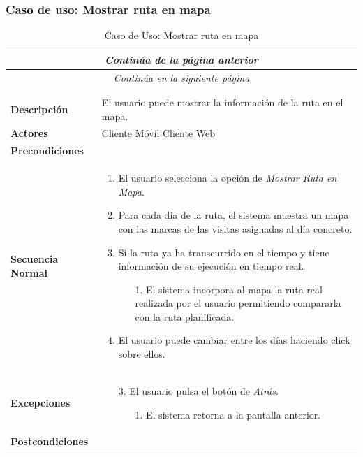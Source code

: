 \subsubsection*{Caso de uso: Mostrar ruta en mapa}
\begin{longtable}{| p{4cm} | p{10cm} |}
\endfirsthead
\multicolumn{2}{c}{\textit{Continúa de la página anterior}}\\[12pt]
\hline
\endhead
\hline
\multicolumn{2}{c}{\textit{Continúa en la siguiente página}} \\
\endfoot
\hline
\caption{Caso de Uso: Mostrar ruta en mapa}\label{fig:1}\\
\endlastfoot


\hline
\multicolumn{2}{|c|}{\textbf{CU$<$09$>$ - Mostrar Ruta en Mapa}} \\

\hline
\textbf{Descripción} &
El usuario puede mostrar la información de la ruta en el mapa.\\

\hline
\textbf{Actores} &
Cliente Móvil\newline
Cliente Web\\

\hline
\textbf{Precondiciones} &
\\

\hline
\textbf{Secuencia Normal} &\mbox{}\par\vspace{-\baselineskip}
\begin{enumerate}[leftmargin=0.7cm, topsep=0.1cm]
\item El usuario selecciona la opción de \textit{Mostrar Ruta en Mapa}.
\item Para cada día de la ruta, el sistema muestra un mapa con las marcas de las visitas asignadas al día concreto.
\item Si la ruta ya ha transcurrido en el tiempo y tiene información de su ejecución en tiempo real.
	\begin{itemize}
	\item[1.] El sistema incorpora al mapa la ruta real realizada por el usuario permitiendo compararla con la ruta planificada.
	\end{itemize}
\item El usuario puede cambiar entre los días haciendo click sobre ellos.
\end{enumerate}\\

\hline
\textbf{Excepciones} &\mbox{}\par\vspace{-\baselineskip}
\begin{enumerate}[leftmargin=0.9cm, topsep=0.1cm]
\item[3.] El usuario pulsa el botón de \textit{Atrás}.
	\begin{itemize}
	\item[1.] El sistema retorna a la pantalla anterior.
	\end{itemize}
\end{enumerate}
\\

\hline
\textbf{Postcondiciones} & \\
\hline
\end{longtable}
